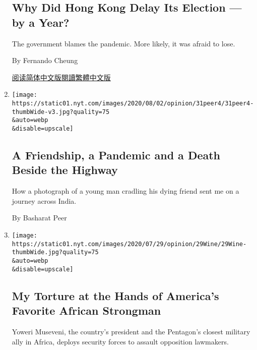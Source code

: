 \begin{enumerate}
  \hypertarget{why-did-hong-kong-delay-its-election--by-a-year}{%
  \subsection{Why Did Hong Kong Delay Its Election --- by a
  Year?}\label{why-did-hong-kong-delay-its-election--by-a-year}}

  The government blames the pandemic. More likely, it was afraid to
  lose.

  By Fernando Cheung

  \href{https://cn.nytimes.com/opinion/20200803/hong-kong-election-china/}{阅读简体中文版}\href{https://cn.nytimes.com/opinion/20200803/hong-kong-election-china/zh-hant/}{閱讀繁體中文版}
\item
  \href{/2020/07/31/opinion/sunday/India-migration-coronavirus.html}{}

  \texttt{[image: https://static01.nyt.com/images/2020/08/02/opinion/31peer4/31peer4-thumbWide-v3.jpg?quality=75\\\&auto=webp\\\&disable=upscale]}

  \hypertarget{a-friendship-a-pandemic-and-a-death-beside-the-highway}{%
  \subsection{A Friendship, a Pandemic and a Death Beside the
  Highway}\label{a-friendship-a-pandemic-and-a-death-beside-the-highway}}

  How a photograph of a young man cradling his dying friend sent me on a
  journey across India.

  By Basharat Peer
\item
  \href{/2020/07/29/opinion/uganda-museveni-repression.html}{}

  \texttt{[image: https://static01.nyt.com/images/2020/07/29/opinion/29Wine/29Wine-thumbWide.jpg?quality=75\\\&auto=webp\\\&disable=upscale]}

  \hypertarget{my-torture-at-the-hands-of-americas-favorite-african-strongman}{%
  \subsection{My Torture at the Hands of America's Favorite African
  Strongman}\label{my-torture-at-the-hands-of-americas-favorite-african-strongman}}

  Yoweri Museveni, the country's president and the Pentagon's closest
  military ally in Africa, deploys security forces to assault opposition
  lawmakers.


\end{enumerate}
